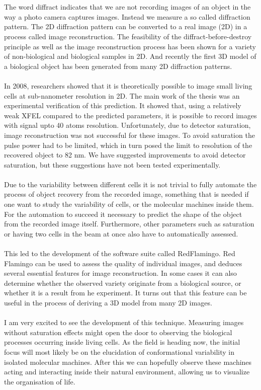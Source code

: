 \\\\
The word diffract indicates that we are not recording images of an object in the way a photo camera captures images. Instead we measure a so called diffraction pattern. The 2D diffraction pattern can be converted to a real image (2D) in a process called image reconstruction. The feasibility of the diffract-before-destroy principle as well as the image reconstruction process has been shown for a variety of non-biological and biological samples in 2D.  And recently the first 3D model of a biological object has been generated from many 2D diffraction patterns.
\\\\
In 2008, researchers showed that it is theoretically possible to image small living cells at sub-nanometer resolution in 2D. The main work of the thesis was an experimental verification of this prediction. It showed that, using a relatively weak XFEL compared to the predicted parameters, it is possible to record images with signal upto 40 atoms resolution. Unfortunately, due to detector saturation, image reconstruction was not successful for these images. To avoid saturation the pulse power had to be limited, which in turn posed the limit to resolution of the recovered object to 82 nm. We have suggested improvements to avoid detector saturation, but these suggestions have not been tested experimentally.
\\\\
Due to the variability between different cells it is not trivial to fully automate the process of object recovery from the recorded image, something that is needed if one want to study the variability of cells, or the molecular machines inside them. For the automation to succeed it necessary to predict the shape of the object from the recorded image itself. Furthermore, other parameters such as saturation or having two cells in the beam at once also have to automatically assessed.
\\\\
This led to the development of the software suite called RedFlamingo. Red Flamingo can be used to assess the quality of individual images, and deduces several essential features for image reconstruction. In some cases it can also determine whether the observed variety originate from a biological source, or whether it is a result from he experiment. It turns out that this feature can be useful in the process of deriving a 3D model from many 2D images. 
\\\\
I am very excited to see the development of this technique. Measuring images without saturation effects might open the door to observing the biological processes occurring inside living cells. As the field is heading now, the initial focus will most likely be on the elucidation of conformational variability in isolated molecular machines. After this we can hopefully observe these machines acting and interacting inside their natural environment, allowing us to visualize the organisation of life.

